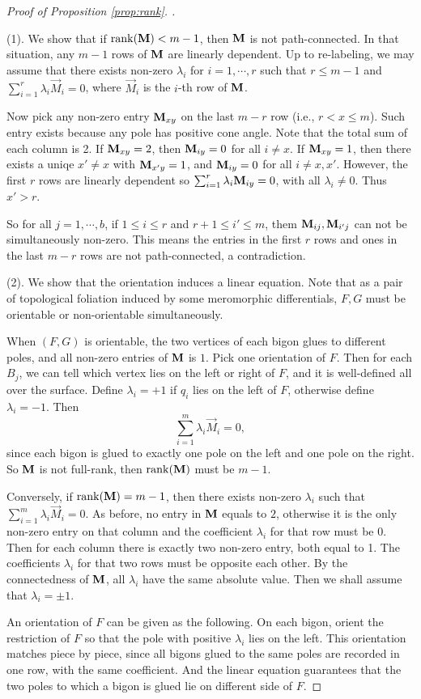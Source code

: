 \documentclass[pdflatex,sn-mathphys]{sn-jnl}%
\numberwithin{equation}{section}
\theoremstyle{thmstyleone}%
\begin{document}
\begin{proof}[Proof of Proposition \ref{prop:rank}. ] ~

    (1). We show that if $\mathrm{rank}(\mathbf{M}) < m-1$, then $\mathbf{M}$ is not path-connected.
    In that situation, any $m-1$ rows of $\mathbf{M}$ are linearly dependent. Up to re-labeling, we may assume that there exists non-zero $\lambda_i$ for $i=1,\cdots , r$ such that
    $r\leq m-1$ and $\sum_{i=1}^{r} \lambda_i \vec{M}_i = 0$,
    where $\vec{M}_i$ is the $i$-th row of $\mathbf{M}$.

    Now pick any non-zero entry $\mathbf{M}_{xy}$ on the last $m-r$ row (i.e., $r< x \leq m$). Such entry exists because any pole has positive cone angle. Note that the total sum of each column is 2. If $\mathbf{M}_{xy}=2$, then $\mathbf{M}_{iy}=0$ for all $i\neq x$. If $\mathbf{M}_{xy}=1$, then there exists a uniqe $x'\neq x$ with $\mathbf{M}_{x' y}=1$, and $\mathbf{M}_{iy}=0$ for all $i\neq x, x'$.
    However, the first $r$ rows are linearly dependent so $\sum_{i=1}^{r} \lambda_i \mathbf{M}_{iy} =0$, with all $\lambda_i\neq0$. Thus $x'>r$.

    So for all $j=1,\cdots, b$, if $1\leq i \leq r$ and $r+1 \leq i' \leq m$, them $\mathbf{M}_{ij}, \mathbf{M}_{i'j}$ can not be simultaneously non-zero. This means the entries in the first $r$ rows and ones in the last $m-r$ rows are not path-connected, a contradiction.

    \bigskip
    (2). We show that the orientation induces a linear equation. Note that as a pair of topological foliation induced by some meromorphic differentials, $F,G$ must be orientable or non-orientable simultaneously.

    When $(F,G)$ is orientable, the two vertices of each bigon glues to different poles, and all non-zero entries of $\mathbf{M}$ is $1$. Pick one orientation of $F$. Then for each $B_j$, we can tell which vertex lies on the left or right of $F$, and it is well-defined all over the surface. Define $\lambda_i=+1$ if $q_i$ lies on the left of $F$, otherwise define $\lambda_i=-1$. Then 
    \[ \sum_{i=1}^m \lambda_i \vec{M}_i =0, \] 
    since each bigon is glued to exactly one pole on the left and one pole on the right. So $\mathbf{M}$ is not full-rank, then $\mathrm{rank}(\mathbf{M})$ must be $m-1$.

    \medskip
    Conversely, if $\mathrm{rank}(\mathbf{M})= m-1$, then there exists non-zero $\lambda_i$ such that $\sum_{i=1}^m \lambda_i \vec{M}_i =0$. As before, no entry in $\mathbf{M}$ equals to $2$, otherwise it is the only non-zero entry on that column and the coefficient $\lambda_i$ for that row must be 0. Then for each column there is exactly two non-zero entry, both equal to 1. The coefficients $\lambda_i$ for that two rows must be opposite each other. By the connectedness of $\mathbf{M}$, all $\lambda_i$ have the same absolute value. Then we shall assume that $\lambda_i=\pm1$.

    An orientation of $F$ can be given as the following. On each bigon, orient the restriction of $F$ so that the pole with positive $\lambda_i$ lies on the left. This orientation matches piece by piece, since all bigons glued to the same poles are recorded in one row, with the same coefficient. And the linear equation guarantees that the two poles to which a bigon is glued lie on different side of $F$.
\end{proof}
\end{document}
